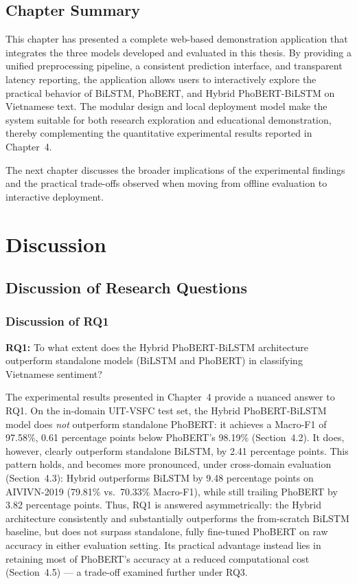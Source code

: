 \documentclass[12pt]{report} %
\begin{document}
\section{Chapter Summary}

This chapter has presented a complete web-based demonstration application that integrates the three models developed and evaluated in this thesis. By providing a unified preprocessing pipeline, a consistent prediction interface, and transparent latency reporting, the application allows users to interactively explore the practical behavior of BiLSTM, PhoBERT, and Hybrid PhoBERT-BiLSTM on Vietnamese text. The modular design and local deployment model make the system suitable for both research exploration and educational demonstration, thereby complementing the quantitative experimental results reported in Chapter~4.

The next chapter discusses the broader implications of the experimental findings and the practical trade-offs observed when moving from offline evaluation to interactive deployment.


\chapter{Discussion}

\section{Discussion of Research Questions}

\subsection{Discussion of RQ1}
\textbf{RQ1:} To what extent does the Hybrid PhoBERT-BiLSTM architecture outperform standalone models (BiLSTM and PhoBERT) in classifying Vietnamese sentiment?

The experimental results presented in Chapter~4 provide a nuanced answer to RQ1. On the in-domain UIT-VSFC test set, the Hybrid PhoBERT-BiLSTM model does \textit{not} outperform standalone PhoBERT: it achieves a Macro-F1 of 97.58\%, 0.61 percentage points below PhoBERT's 98.19\% (Section~4.2). It does, however, clearly outperform standalone BiLSTM, by 2.41 percentage points. This pattern holds, and becomes more pronounced, under cross-domain evaluation (Section~4.3): Hybrid outperforms BiLSTM by 9.48 percentage points on AIVIVN-2019 (79.81\% vs.\ 70.33\% Macro-F1), while still trailing PhoBERT by 3.82 percentage points. Thus, RQ1 is answered asymmetrically: the Hybrid architecture consistently and substantially outperforms the from-scratch BiLSTM baseline, but does not surpass standalone, fully fine-tuned PhoBERT on raw accuracy in either evaluation setting. Its practical advantage instead lies in retaining most of PhoBERT's accuracy at a reduced computational cost (Section~4.5) --- a trade-off examined further under RQ3.
\end{document}
